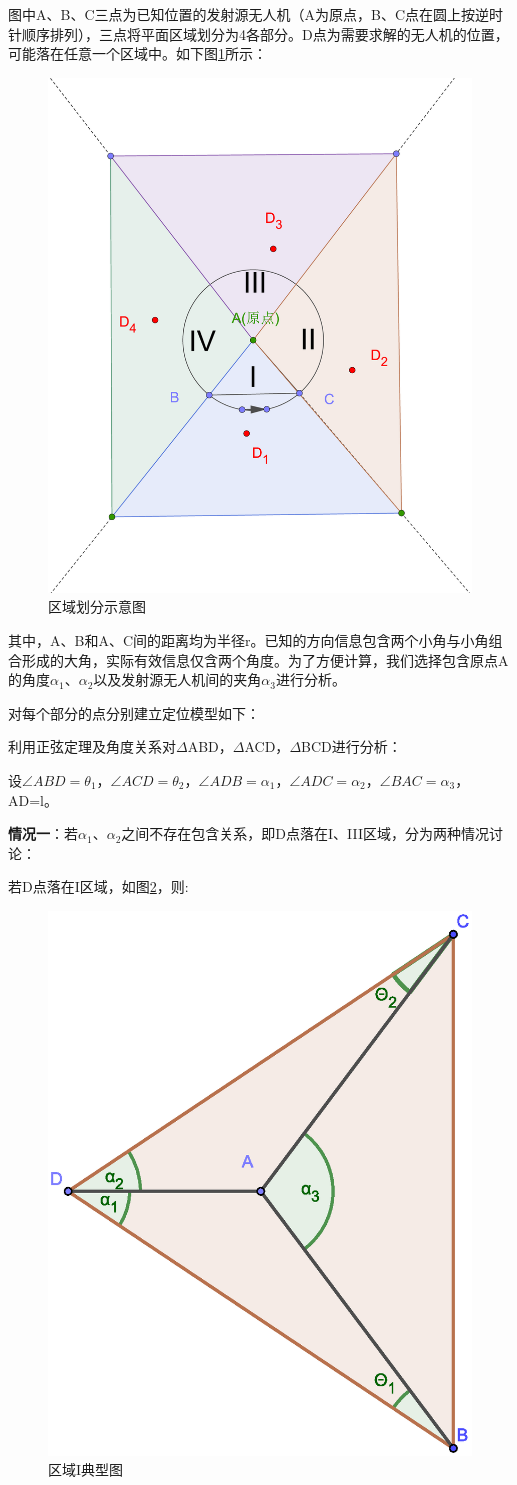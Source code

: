 \documentclass{ctexart}
\begin{document}
图中A、B、C三点为已知位置的发射源无人机（A为原点，B、C点在圆上按逆时针顺序排列），三点将平面区域划分为4各部分。D点为需要求解的无人机的位置，可能落在任意一个区域中。如下图\ref{区域划分示意图}所示：

\begin{figure}[H]
  \centering
  \includegraphics[width=0.40\linewidth]{pic/quadrant(1).eps}
  \caption{区域划分示意图}
  \label{区域划分示意图}
  \end{figure} 


其中，A、B和A、C间的距离均为半径r。已知的方向信息包含两个小角与小角组合形成的大角，实际有效信息仅含两个角度。为了方便计算，我们选择包含原点A的角度$\alpha_1$、$\alpha_2$以及发射源无人机间的夹角$\alpha_3$进行分析。

对每个部分的点分别建立定位模型如下：

利用正弦定理及角度关系对$\Delta$ABD，$\Delta$ACD，$\Delta$BCD进行分析：

设$\angle ABD=\theta_1$，$\angle ACD=\theta_2$，$\angle ADB=\alpha_1$，$\angle ADC=\alpha_2$，$\angle BAC=\alpha_3$，AD=l。

\textbf{情况一}：若$\alpha_1$、$\alpha_2$之间不存在包含关系，即D点落在I、III区域，分为两种情况讨论：

若D点落在I区域，如图\ref{区域I典型图}，则:

\begin{figure}[H]
  \centering
  \includegraphics[width=0.35\linewidth]{pic/case1++.eps}
  \caption{区域I典型图}
  \label{区域I典型图}
  \end{figure} 
\end{document}
